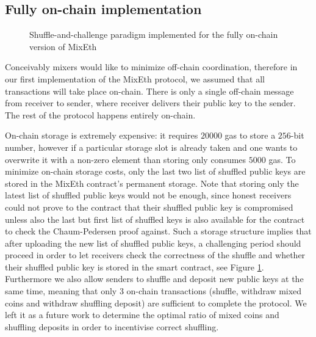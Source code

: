 \documentclass[a4paper]{article}
\theoremstyle{definition}
\begin{document}
\subsection{Fully on-chain implementation} \label{fullyonchainimpl}

\begin{figure}
	\centering
{}
\captionsetup{justification=centering}
\caption{Shuffle-and-challenge paradigm implemented for the fully on-chain version of MixEth}
\label{fig:shuffleandchallenge}
\end{figure}

Conceivably mixers would like to minimize off-chain coordination, therefore in our first implementation of the MixEth protocol, we assumed that all transactions will take place on-chain. There is only a single off-chain message from receiver to sender, where receiver delivers their public key to the sender. The rest of the protocol happens entirely on-chain.

On-chain storage is extremely expensive: it requires $\num[group-separator={,}]{20000}$ gas to store a $256$-bit number, however if a particular storage slot is already taken and one wants to overwrite it with a non-zero element than storing only consumes $\num[group-separator={,}]{5000}$ gas. To minimize on-chain storage costs, only the last two list of shuffled public keys are stored in the MixEth contract's permanent storage. Note that storing only the latest list of shuffled public keys would not be enough, since honest receivers could not prove to the contract that their shuffled public key is compromised unless also the last but first list of shuffled keys is also available for the contract to check the Chaum-Pedersen proof against. Such a storage structure implies that after uploading the new list of shuffled public keys, a challenging period should proceed in order to let receivers check the correctness of the shuffle and whether their shuffled public key is stored in the smart contract, see Figure \ref{fig:shuffleandchallenge}. Furthermore we also allow senders to shuffle and deposit new public keys at the same time, meaning that only $3$ on-chain transactions (shuffle, withdraw mixed coins and withdraw shuffling deposit) are sufficient to complete the protocol. We left it as a future work to determine the optimal ratio of mixed coins and shuffling deposits in order to incentivise correct shuffling.
\end{document}
